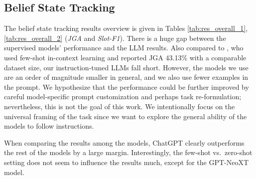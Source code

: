 \subsection{Belief State Tracking}
\label{subsec:dst}
The belief state tracking results overview is given in Tables \ref{tab:res_overall_1},\ref{tab:res_overall_2} (\emph{JGA} and \emph{Slot-F1}).
There is a huge gap between the supervised models' performance and the LLM results.
Also compared to \citet{hu-etal-2022-context}, who used few-shot in-context learning and reported JGA 43.13\% with a comparable dataset size, our instruction-tuned LLMs fall short.
However, the models we use are an order of magnitude smaller in general, and we also use fewer examples in the prompt.
We hypothesize that the performance could be further improved by careful model-specific prompt customization and perhaps task re-formulation; nevertheless, this is not the goal of this work.
We intentionally focus on the universal framing of the task since we want to explore the general ability of the models to follow instructions.

When comparing the results among the models, ChatGPT clearly outperforms the rest of the models by a large margin. 
Interestingly, the few-shot vs.\ zero-shot setting does not seem to influence the results much, except for the GPT-NeoXT model.

